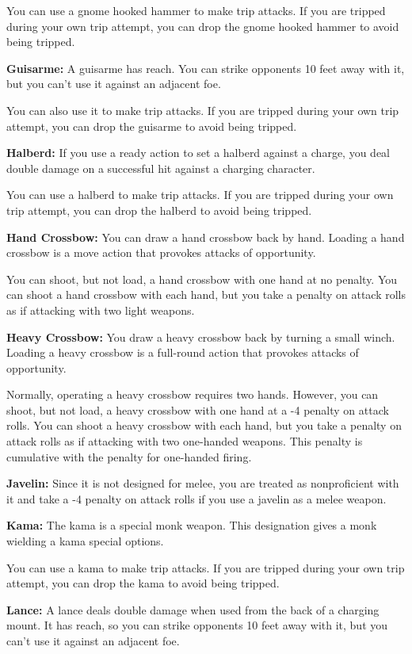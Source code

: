 \begin{multicols}{2}
You can use a gnome hooked hammer to make trip attacks. If you are tripped during your own trip attempt, you can drop the gnome hooked hammer to avoid being tripped.

\textbf{Guisarme:} A guisarme has reach. You can strike opponents 10 feet away with it, but you can't use it against an adjacent foe.

You can also use it to make trip attacks. If you are tripped during your own trip attempt, you can drop the guisarme to avoid being tripped.

\textbf{Halberd:} If you use a ready action to set a halberd against a charge, you deal double damage on a successful hit against a charging character.

You can use a halberd to make trip attacks. If you are tripped during your own trip attempt, you can drop the halberd to avoid being tripped.

\textbf{Hand Crossbow:} You can draw a hand crossbow back by hand. Loading a hand crossbow is a move action that provokes attacks of opportunity.

You can shoot, but not load, a hand crossbow with one hand at no penalty. You can shoot a hand crossbow with each hand, but you take a penalty on attack rolls as if attacking with two light weapons.

\textbf{Heavy Crossbow:} You draw a heavy crossbow back by turning a small winch. Loading a heavy crossbow is a full-round action that provokes attacks of opportunity.

Normally, operating a heavy crossbow requires two hands. However, you can shoot, but not load, a heavy crossbow with one hand at a -4 penalty on attack rolls. You can shoot a heavy crossbow with each hand, but you take a penalty on attack rolls as if attacking with two one-handed weapons. This penalty is cumulative with the penalty for one-handed firing.

\textbf{Javelin:} Since it is not designed for melee, you are treated as nonproficient with it and take a -4 penalty on attack rolls if you use a javelin as a melee weapon.

\textbf{Kama:} The kama is a special monk weapon. This designation gives a monk wielding a kama special options.

You can use a kama to make trip attacks. If you are tripped during your own trip attempt, you can drop the kama to avoid being tripped.

\textbf{Lance:} A lance deals double damage when used from the back of a charging mount. It has reach, so you can strike opponents 10 feet away with it, but you can't use it against an adjacent foe.


\end{multicols}
